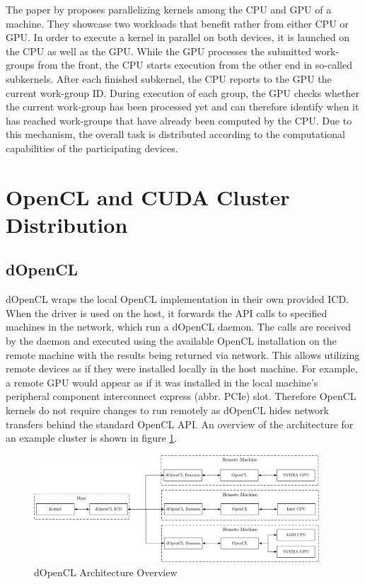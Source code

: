 The paper by \citeauthor{fluidic} proposes parallelizing kernels among the CPU and GPU of a machine\cite{fluidic}. They showcase two workloads that benefit rather from either CPU or GPU. In order to execute a kernel in parallel on both devices, it is launched on the CPU as well as the GPU. While the GPU processes the submitted work-groups from the front, the CPU starts execution from the other end in so-called subkernels. After each finished subkernel, the CPU reports to the GPU the current work-group ID. During execution of each group, the GPU checks whether the current work-group has been processed yet and can therefore identify when it has reached work-groups that have already been computed by the CPU. Due to this mechanism, the overall task is distributed according to the computational capabilities of the participating devices.


\section{OpenCL and CUDA Cluster Distribution}
\label{cluster_distribution}
\subsection*{dOpenCL}

dOpenCL wraps the local OpenCL implementation in their own provided ICD. When the driver is used on the host, it forwards the API calls to specified machines in the network, which run a dOpenCL daemon\cite{dopencl}. The calls are received by the daemon and executed using the available OpenCL installation on the remote machine with the results being returned via network. This allows utilizing remote devices as if they were installed locally in the host machine. For example, a remote GPU would appear as if it was installed in the local machine's peripheral component interconnect express (abbr. PCIe) slot. Therefore OpenCL kernels do not require changes to run remotely as dOpenCL hides network transfers behind the standard OpenCL API. An overview of the architecture for an example cluster is shown in figure \ref{img:dopencl_arch}.

\begin{figure}[H]

	\includegraphics[width=0.95\textwidth]{drawings/dopencl_arch.pdf}
	\centering
	\caption{dOpenCL Architecture Overview}
	\label{img:dopencl_arch}
\end{figure}

